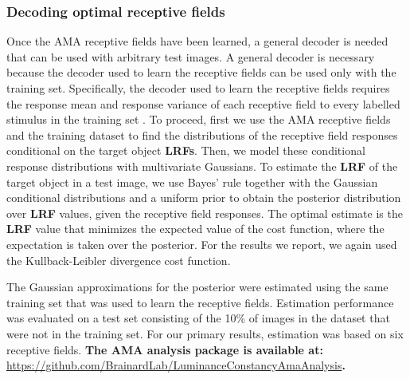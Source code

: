 \documentclass{jov}
\providecommand{\DIFaddtex}[1]{{\bf #1}} %
\providecommand{\DIFdeltex}[1]{} %
\providecommand{\DIFaddbegin}{} %
\providecommand{\DIFaddend}{} %
\providecommand{\DIFdelbegin}{} %
\providecommand{\DIFdelend}{} %
\providecommand{\DIFadd}[1]{\texorpdfstring{\DIFaddtex{#1}}{#1}} %
\providecommand{\DIFdel}[1]{\texorpdfstring{\DIFdeltex{#1}}{}} %
\newcommand{\DIFscaledelfig}{0.5}
\newlength{\DIFdelgraphicswidth} %
\newlength{\DIFdelgraphicsheight} %
\newcommand{\DIFaddincludegraphics}[2][]{{\color{blue}\fbox{\DIFOincludegraphics[#1]{#2}}}} %
\newcommand{\DIFdelincludegraphics}[2][]{%
\sbox{\DIFdelgraphicsbox}{\DIFOincludegraphics[#1]{#2}}%
\settoboxwidth{\DIFdelgraphicswidth}{\DIFdelgraphicsbox} %
\settoboxtotalheight{\DIFdelgraphicsheight}{\DIFdelgraphicsbox} %
\scalebox{\DIFscaledelfig}{%
\parbox[b]{\DIFdelgraphicswidth}{\usebox{\DIFdelgraphicsbox}\\[-\baselineskip] \rule{\DIFdelgraphicswidth}{0em}}\llap{\resizebox{\DIFdelgraphicswidth}{\DIFdelgraphicsheight}{%
\setlength{\unitlength}{\DIFdelgraphicswidth}%
\begin{picture}(1,1)%
\thicklines\linethickness{2pt} %
{\color[rgb]{1,0,0}\put(0,0){\framebox(1,1){}}}%
{\color[rgb]{1,0,0}\put(0,0){\line( 1,1){1}}}%
{\color[rgb]{1,0,0}\put(0,1){\line(1,-1){1}}}%
\end{picture}%
}\hspace*{3pt}}} %
} %
\DeclareRobustCommand{\DIFaddbegin}{\DIFOaddbegin \let\includegraphics\DIFaddincludegraphics} %
\DeclareRobustCommand{\DIFaddend}{\DIFOaddend \let\includegraphics\DIFOincludegraphics} %
\DeclareRobustCommand{\DIFdelbegin}{\DIFOdelbegin \let\includegraphics\DIFdelincludegraphics} %
\DeclareRobustCommand{\DIFdelend}{\DIFOaddend \let\includegraphics\DIFOincludegraphics} %
\begin{document}
\subsubsection*{Decoding optimal receptive fields}

Once the AMA receptive fields have been learned, a general decoder is needed that can be used with arbitrary test images.
A general decoder is necessary because the decoder used to learn the receptive fields can be used only with the training set. Specifically, the decoder used to learn the receptive fields requires the response mean and response variance of each receptive field to every labelled stimulus in the training set \cite{geisler2009optimal,burge2017accuracy}.
To proceed, first we use the AMA receptive fields and the training dataset to find the distributions of the receptive field responses conditional on the target object \DIFdelbegin \DIFdel{LRVs}\DIFdelend \DIFaddbegin \DIFadd{LRFs}\DIFaddend .
Then, we model these conditional response distributions with multivariate Gaussians.
To estimate the \DIFdelbegin \DIFdel{LRV }\DIFdelend \DIFaddbegin \DIFadd{LRF }\DIFaddend of the target object in a test image, we use Bayes' rule together with the Gaussian conditional distributions and a uniform prior to obtain the posterior distribution over \DIFdelbegin \DIFdel{LRV }\DIFdelend \DIFaddbegin \DIFadd{LRF }\DIFaddend values, given the receptive field responses.
The optimal estimate is the \DIFdelbegin \DIFdel{LRV }\DIFdelend \DIFaddbegin \DIFadd{LRF }\DIFaddend value that minimizes the expected value of the cost function, where the expectation is taken over the posterior.
For the results we report, we again used the Kullback-Leibler divergence cost function.

The Gaussian approximations for the posterior were estimated using the same training set that was used to learn the receptive fields.
Estimation performance was evaluated on a test set consisting of the 10\% of images in the dataset that were not in the training set.
For our primary results, estimation was based on six receptive fields.
\DIFaddbegin \DIFadd{The AMA analysis package is available at: }\href{https://github.com/BrainardLab/LuminanceConstancyAmaAnalysis}{https://github.com/BrainardLab/LuminanceConstancyAmaAnalysis}\DIFadd{.
}\DIFaddend 
\end{document}
